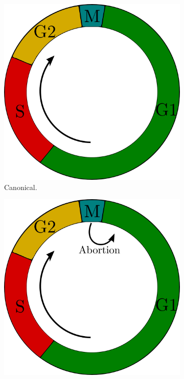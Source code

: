\documentclass[11pt,twoside,a4paper]{report}
\begin{document}
		\begin{figure}[here]
			\centering
			\begin{subfigure}{.33\textwidth}
				\centering
				\includegraphics[width=0.95\linewidth]{pngs/cell_cycle.png}
				\caption{Canonical.}
			\end{subfigure}%
			\begin{subfigure}{.33\textwidth}
				\centering
				\includegraphics[width=0.95\linewidth]{pngs/cell_cycle_abortive.png}

\end{subfigure}
\end{figure}
\end{document}

